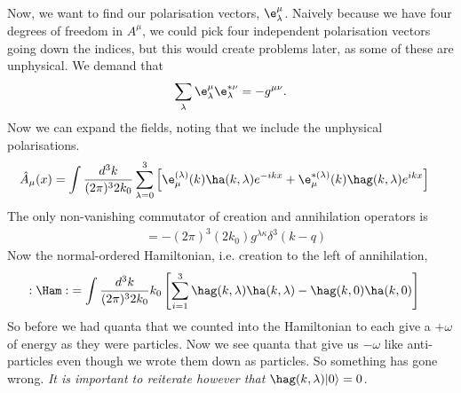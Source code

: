 \documentclass[a4paper, 11pt, normalem]{report}
\begin{document}
Now, we want to find our polarisation vectors, $\e^\mu_\lambda$.
Naively because we have four degrees of freedom in $A^\mu$, we could pick four independent polarisation vectors going down the indices, but this would create problems later, as some of these are unphysical.
We demand that
\begin{align}
    \sum_\lambda \e_\lambda^\mu \e^{*\nu}_\lambda = -g^{\mu\nu}.
\end{align} 
Now we can expand the fields, noting that we include the unphysical polarisations.
\begin{align}
    \hat{A}_\mu(x) &= \int \frac{d^3k}{(2\pi)^32k_0} \sum_{\lambda=0}^3 \left[\e_{\mu}^{(\lambda)}(k)\ha(k,\lambda)e^{-ikx} + \e_{\mu}^{*(\lambda)}(k)\hag(k,\lambda)e^{ikx}\right]
\end{align} 
The only non-vanishing commutator of creation and annihilation operators is
\begin{align}
    [\ha(k,\lambda),\hag(q,\kappa)] &= -(2\pi)^3(2k_0)g^{\lambda\kappa}\delta^3(k-q)
\end{align}
Now the normal-ordered Hamiltonian, i.e. creation to the left of annihilation,
\begin{align}
    :\Ham: &= \int \frac{d^3k}{(2\pi)^32k_0} k_0\left[\sum_{i=1}^3 \hag(k,\lambda)\ha(k,\lambda) - \hag(k,0)\ha(k,0)\right]
\end{align}
So before we had quanta that we counted into the Hamiltonian to each give a $+\omega$ of energy as they were particles. 
Now we see quanta that give us $-\omega$ like anti-particles even though we wrote them down as particles.
So something has gone wrong. 
\textit{It is important to reiterate however that $\hag(k,\lambda)|0\rangle = 0$.}
\end{document}
